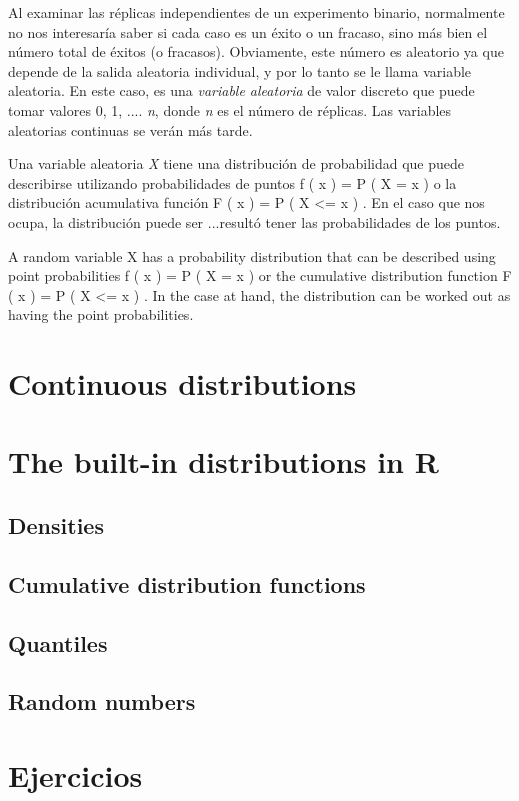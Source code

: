 Al examinar las réplicas independientes de un experimento binario, normalmente
no nos interesaría saber si cada caso es un éxito o un fracaso, sino más bien el
número total de éxitos (o fracasos). Obviamente, este número es aleatorio ya que
depende de la salida aleatoria individual, y por lo tanto se le llama variable
aleatoria. En este caso, es una \textit{variable aleatoria} de valor discreto
que puede tomar valores 0, 1, .... \textit{n}, donde \textit{n} es el número de
réplicas. Las variables aleatorias continuas se verán más tarde.

Una variable aleatoria \textit{X} tiene una distribución de probabilidad que puede describirse utilizando
probabilidades de puntos f ( x ) = P ( X = x ) o la distribución acumulativa
función F ( x ) = P ( X <= x ) . En el caso que nos ocupa, la distribución puede ser
...resultó tener las probabilidades de los puntos.


A random variable X has a probability distribution that can be described using
point probabilities f ( x ) = P ( X = x ) or the cumulative distribution
function F ( x ) = P ( X <= x ) . In the case at hand, the distribution can be
worked out as having the point probabilities.

\section{Continuous distributions}
\section{The built-in distributions in R}
\subsection{Densities}
\subsection{Cumulative distribution functions}
\subsection{Quantiles}
\subsection{Random numbers}
\section{Ejercicios}
\newpage
